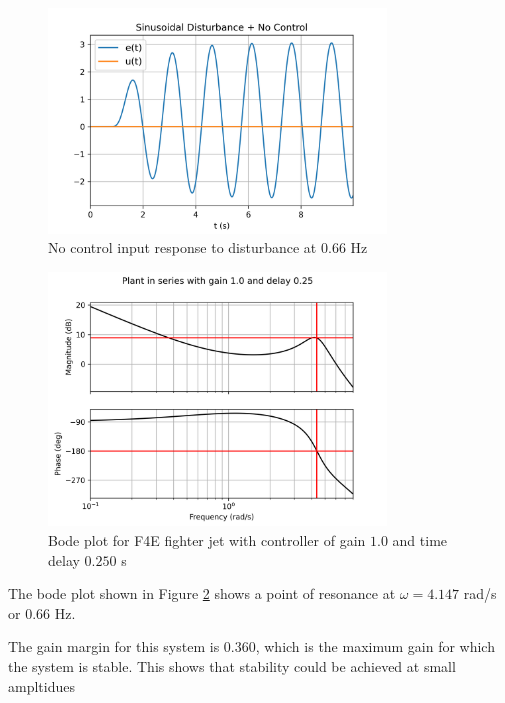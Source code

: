 \documentclass[8pt]{article}
\begin{document}
\newpage

\begin{figure}[H]
    \centering
    \includegraphics[width=0.8\textwidth]{figures/FIGURE_8.png}
    \caption{No control input response to disturbance at $0.66$ Hz}
    \label{fig:figure8}
\end{figure}

\begin{figure}[H]
    \centering
    \includegraphics[width=0.8\textwidth]{figures/FIGURE_9.png}
    \caption{Bode plot for F4E fighter jet with controller of gain $1.0$ and time delay $0.250$ s}
    \label{fig:figure9}
\end{figure}

The bode plot shown in Figure \ref{fig:figure9} shows a point of resonance at $\omega = 4.147$ rad/s or $0.66$ Hz.

The gain margin for this system is 0.360, which is the maximum gain for which the system is stable.
This shows that stability could be achieved at small ampltidues

\newpage
\end{document}
